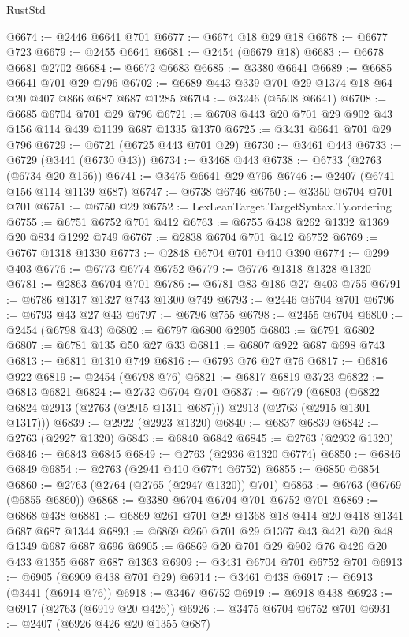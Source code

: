 \begin{lexlean}{RustStd}
\begin{coremodule}
@6674 := @2446 @6641 @701
@6677 := @6674 @18 @29 @18
@6678 := @6677 @723
@6679 := @2455 @6641
@6681 := @2454 (@6679 @18)
@6683 := @6678 @6681 @2702
@6684 := @6672 @6683
@6685 := @3380 @6641
@6689 := @6685 @6641 @701 @29 @796
@6702 := @6689 @443 @339 @701 @29 @1374 @18 @64 @20 @407 @866 @687 @687 @1285
@6704 := @3246 (@5508 @6641)
@6708 := @6685 @6704 @701 @29 @796
@6721 := @6708 @443 @20 @701 @29 @902 @43 @156 @114 @439 @1139 @687 @1335 @1370
@6725 := @3431 @6641 @701 @29 @796
@6729 := @6721 (@6725 @443 @701 @29)
@6730 := @3461 @443
@6733 := @6729 (@3441 (@6730 @43))
@6734 := @3468 @443
@6738 := @6733 (@2763 (@6734 @20 @156))
@6741 := @3475 @6641 @29 @796
@6746 := @2407 (@6741 @156 @114 @1139 @687)
@6747 := @6738 @6746
@6750 := @3350 @6704 @701 @701
@6751 := @6750 @29
@6752 := LexLeanTarget.TargetSyntax.Ty.ordering
@6755 := @6751 @6752 @701 @412
@6763 := @6755 @438 @262 @1332 @1369 @20 @834 @1292 @749
@6767 := @2838 @6704 @701 @412 @6752
@6769 := @6767 @1318 @1330
@6773 := @2848 @6704 @701 @410 @390
@6774 := @299 @403
@6776 := @6773 @6774 @6752
@6779 := @6776 @1318 @1328 @1320
@6781 := @2863 @6704 @701
@6786 := @6781 @83 @186 @27 @403 @755
@6791 := @6786 @1317 @1327 @743 @1300 @749
@6793 := @2446 @6704 @701
@6796 := @6793 @43 @27 @43
@6797 := @6796 @755
@6798 := @2455 @6704
@6800 := @2454 (@6798 @43)
@6802 := @6797 @6800 @2905
@6803 := @6791 @6802
@6807 := @6781 @135 @50 @27 @33
@6811 := @6807 @922 @687 @698 @743
@6813 := @6811 @1310 @749
@6816 := @6793 @76 @27 @76
@6817 := @6816 @922
@6819 := @2454 (@6798 @76)
@6821 := @6817 @6819 @3723
@6822 := @6813 @6821
@6824 := @2732 @6704 @701
@6837 := @6779
    (@6803 (@6822 @6824 @2913 (@2763 (@2915 @1311 @687))) @2913 (@2763 (@2915 @1301 @1317)))
@6839 := @2922 (@2923 @1320)
@6840 := @6837 @6839
@6842 := @2763 (@2927 @1320)
@6843 := @6840 @6842
@6845 := @2763 (@2932 @1320)
@6846 := @6843 @6845
@6849 := @2763 (@2936 @1320 @6774)
@6850 := @6846 @6849
@6854 := @2763 (@2941 @410 @6774 @6752)
@6855 := @6850 @6854
@6860 := @2763 (@2764 (@2765 (@2947 @1320)) @701)
@6863 := @6763 (@6769 (@6855 @6860))
@6868 := @3380 @6704 @6704 @701 @6752 @701
@6869 := @6868 @438
@6881 := @6869 @261 @701 @29 @1368 @18 @414 @20 @418 @1341 @687 @687 @1344
@6893 := @6869 @260 @701 @29 @1367 @43 @421 @20 @48 @1349 @687 @687 @696
@6905 := @6869 @20 @701 @29 @902 @76 @426 @20 @433 @1355 @687 @687 @1363
@6909 := @3431 @6704 @701 @6752 @701
@6913 := @6905 (@6909 @438 @701 @29)
@6914 := @3461 @438
@6917 := @6913 (@3441 (@6914 @76))
@6918 := @3467 @6752
@6919 := @6918 @438
@6923 := @6917 (@2763 (@6919 @20 @426))
@6926 := @3475 @6704 @6752 @701
@6931 := @2407 (@6926 @426 @20 @1355 @687)

\end{coremodule}
\end{lexlean}
